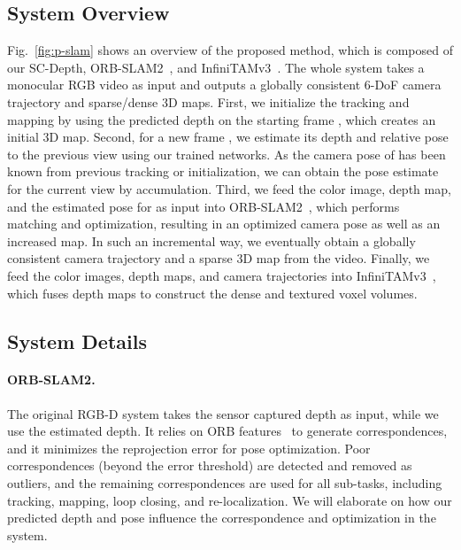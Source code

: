 \documentclass[twocolumn]{svjour3}
\renewcommand{\cite}[1]{\textcolor{blue}{\citep{#1}}}
\newcommand{\figref}[1]{Fig.~\ref{#1}}
\begin{document}
\subsection{System Overview}\label{sec-slam-overview}

\figref{fig:p-slam} shows an overview of the proposed method,
which is composed of our SC-Depth, ORB-SLAM2~\cite{murORB2}, and InfiniTAMv3~\cite{InfiniTAM_V3_Report_2017}.
The whole system takes a monocular RGB video as input and outputs a globally consistent 6-DoF camera trajectory and sparse/dense 3D maps.
First, we initialize the tracking and mapping by using the predicted depth on the starting frame ,
which creates an initial 3D map.
Second, for a new frame , we estimate its depth and relative pose to the previous view  using our trained networks.  
As the camera pose of  has been known from previous tracking or initialization, we can obtain the pose estimate for the current view by accumulation.
Third, we feed the color image, depth map, and the estimated pose for  as input into ORB-SLAM2~\cite{murORB2},
which performs matching and optimization, 
resulting in an optimized camera pose as well as an increased map.
In such an incremental way, we eventually obtain a globally consistent camera trajectory and a sparse 3D map from the video.
Finally, we feed the color images, depth maps, and camera trajectories into InfiniTAMv3~\cite{InfiniTAM_V3_Report_2017},
which fuses depth maps to construct the dense and textured voxel volumes.

\subsection{System Details}\label{sec-slam-details}

\paragraph{ORB-SLAM2.}
The original RGB-D system takes the sensor captured depth as input,
while we use the estimated depth.
It relies on ORB features~\cite{rublee2011orb} to generate correspondences,
and it minimizes the reprojection error for pose optimization.
Poor correspondences (beyond the error threshold) are detected and removed as outliers, 
and the remaining correspondences are used for all sub-tasks, 
including tracking, mapping, loop closing, and re-localization.
We will elaborate on how our predicted depth and pose influence the correspondence and optimization in the system.
\end{document}

